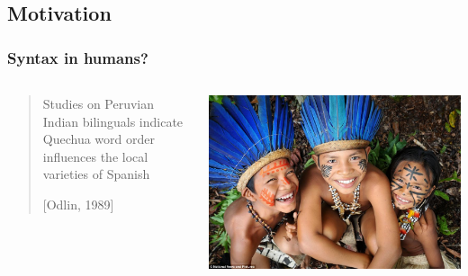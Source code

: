 \documentclass[mathserif,12pt]{beamer}
\begin{document}
\subsection{Motivation}
\begin{frame}
\frametitle{Syntax in humans?}
\begin{center}
\begin{columns}
\begin{column}{0.7\textwidth}
  \begin{quote}
   Studies on Peruvian Indian bilinguals indicate Quechua word order influences the local varieties of Spanish
   
   [Odlin, 1989]
  \end{quote}
\end{column}
\begin{column}{0.3\textwidth}
  \begin{center}
   \includegraphics[width=\textwidth]{figures/amazon-tribes}
  \end{center}
\end{column}
\end{columns}
\vspace{0.5cm}
\begin{columns}

\begin{column}{0.3\textwidth}
   
\end{column}
\end{columns}
\end{center}
\end{frame}
\end{document}
